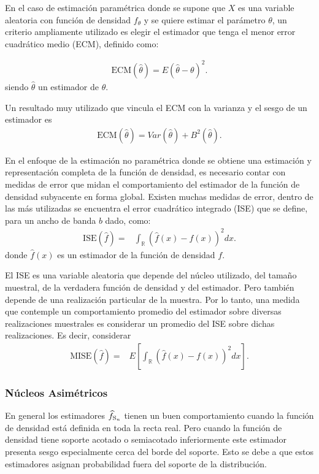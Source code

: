 En el caso de estimación paramétrica donde se supone que $X$ es una variable aleatoria con función de densidad $f_{\theta}$ y se quiere estimar el parámetro $\theta$, un criterio ampliamente utilizado es elegir el estimador que tenga el menor error cuadrático medio (ECM), definido como:

\begin{align}
\label{ErrorCuadraticoMedio}
\text{ECM}(\hat{\theta})=E(\widehat{\theta}-\theta)^2.
\end{align}
siendo $\widehat{\theta}$ un estimador de $\theta$. 

Un resultado muy utilizado que vincula el ECM con la varianza y el sesgo de un estimador es
\begin{align}
\text{ECM}(\hat{\theta})=Var(\hat{\theta})+B^2(\hat{\theta}).
\end{align}	

En el enfoque de la estimación no paramétrica donde se obtiene una estimación y representación completa de la función de densidad, es necesario contar con medidas de error que midan el comportamiento del estimador de la función de densidad subyacente en forma global. Existen muchas medidas de error, dentro de las más utilizadas se encuentra el error cuadrático integrado (ISE) que se define, para un ancho de banda $b$ dado, como:
\begin{align}
\text{ISE}(\widehat{f})=&\int_\mathbb{R} (\widehat{f}(x)-f(x))^2 dx .
\end{align}
donde $\widehat{f}(x)$ es un estimador de la función de densidad $f$.

El ISE es una variable aleatoria que depende del núcleo utilizado, del tamaño muestral, de la verdadera función de densidad y del estimador. Pero también depende de una realización particular de la muestra. Por lo tanto, una medida que contemple un comportamiento promedio del estimador sobre diversas realizaciones muestrales es considerar un promedio del ISE sobre dichas realizaciones. Es decir, considerar
\begin{align}
\label{MISE}
	\text{MISE}(\widehat{f})=&E[\int_\mathbb{R} (\widehat{f}(x)-f(x))^2 dx ].
\end{align}

\subsubsection{Núcleos Asimétricos}
\label{NucleosAsimetricos}

En general los estimadores $\widehat{f}_{\tiny \text {S}_n}$ tienen un buen comportamiento cuando la función de densidad está definida en toda la recta real. Pero cuando la función de densidad tiene soporte acotado o semiacotado inferiormente este estimador presenta sesgo especialmente cerca del borde del soporte. Esto se debe a que estos estimadores asignan probabilidad fuera del soporte de la distribución.

